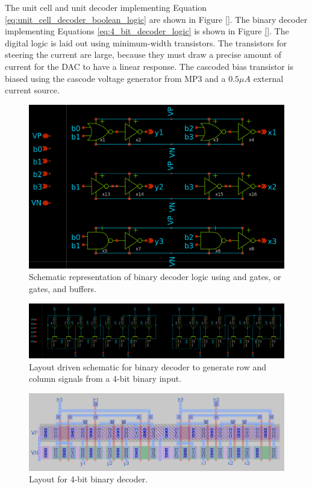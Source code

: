\documentclass{article}
\begin{document}
The unit cell and unit decoder implementing Equation \ref{eq:unit_cell_decoder_boolean_logic} are shown in Figure \ref{}. The binary decoder implementing Equations \ref{eq:4_bit_decoder_logic} is shown in Figure \ref{}. The digital logic is laid out using minimum-width transistors. The transistors for steering the current are large, because they must draw a precise amount of current for the DAC to have a linear response. The cascoded bias transistor is biased using the cascode voltage generator from MP3 and a $0.5\mu A$ external current source.

\begin{figure}[H]
    \centering{}
    \includegraphics[width=0.7\columnwidth]{images/binary_decoder_block_diagram.png}
    \caption{Schematic representation of binary decoder logic using and gates, or gates, and buffers.}
    \label{fig:binary_decoder_block_diagram}
\end{figure}

\begin{figure}[H]
    \centering{}
    \includegraphics[width=0.7\columnwidth]{images/binary_decoder_schematic.png}
    \caption{Layout driven schematic for binary decoder to generate row and column signals from a 4-bit binary input.}
    \label{fig:binary_decoder_schematic}
\end{figure}

\begin{figure}[H]
    \centering{}
    \includegraphics[width=0.7\columnwidth]{images/4_bit_decoder_layout.png}
    \caption{Layout for 4-bit binary decoder.}
    \label{fig:4_bit_decoder_layout}
\end{figure}
\end{document}

